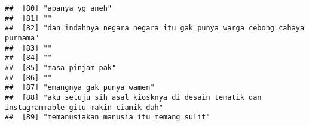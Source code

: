 \documentclass[
]{article}
\begin{document}
\begin{verbatim}
##  [80] "apanya yg aneh"                                                                                                                                                                                                                                                                    
##  [81] ""                                                                                                                                                                                                                                                                                  
##  [82] "dan indahnya negara negara itu gak punya warga cebong cahaya purnama"                                                                                                                                                                                                              
##  [83] ""                                                                                                                                                                                                                                                                                  
##  [84] ""                                                                                                                                                                                                                                                                                  
##  [85] "masa pinjam pak"                                                                                                                                                                                                                                                                   
##  [86] ""                                                                                                                                                                                                                                                                                  
##  [87] "emangnya gak punya wamen"                                                                                                                                                                                                                                                          
##  [88] "aku setuju sih asal kiosknya di desain tematik dan instagrammable gitu makin ciamik dah"                                                                                                                                                                                           
##  [89] "memanusiakan manusia itu memang sulit"                                                                                                                                                                                                                                             

\end{verbatim}
\end{document}
